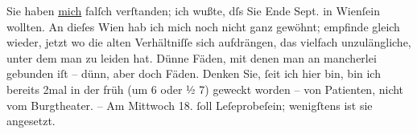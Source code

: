                Sie haben \uline{mich} falſch verſtanden; ich wußte, dſs Sie
               Ende Sept. in Wienſein wollten. An dieſes Wien hab ich mich noch nicht ganz gewöhnt; empfinde gleich
               wieder, jetzt wo die alten Verhältniſſe sich aufdrängen, das vielfach unzulängliche,
               unter dem man zu leiden hat. Dünne Fäden, mit denen {\pb}man an mancherlei gebunden iſt – dünn, aber doch Fäden. Denken Sie, ſeit ich hier
               bin, bin ich bereits 2mal in der früh \introOben{}(um 6 oder ½ 7)\introOben{}
                geweckt worden – von Patienten, nicht vom Burgtheater. – Am Mittwoch 18. ſoll Leſeprobeſein; wenigſtens ist sie angesetzt.\pend
           
